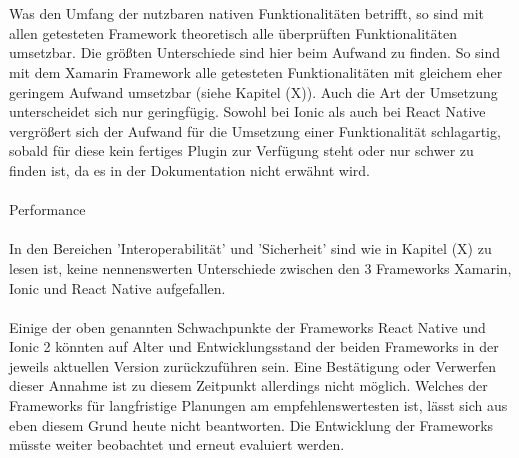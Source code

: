 \\
\\
Was den Umfang der nutzbaren nativen Funktionalitäten betrifft, so sind mit allen getesteten Framework theoretisch alle überprüften Funktionalitäten umsetzbar. Die größten Unterschiede sind hier beim Aufwand zu finden. So sind mit dem Xamarin Framework alle getesteten Funktionalitäten mit gleichem eher geringem Aufwand umsetzbar (siehe Kapitel (X)). Auch die Art der Umsetzung unterscheidet sich nur geringfügig. Sowohl bei Ionic als auch bei React Native vergrößert sich der Aufwand für die Umsetzung einer Funktionalität schlagartig, sobald für diese kein fertiges Plugin zur Verfügung steht oder nur schwer zu finden ist, da es in der Dokumentation nicht erwähnt wird.
\\
\\
Performance
\\
\\
In den Bereichen 'Interoperabilität' und 'Sicherheit' sind wie in Kapitel (X) zu lesen ist, keine nennenswerten Unterschiede zwischen den 3 Frameworks Xamarin, Ionic und React Native aufgefallen.
\\
\\
Einige der oben genannten Schwachpunkte der Frameworks React Native und Ionic 2 könnten auf Alter und Entwicklungsstand der beiden Frameworks in der jeweils aktuellen Version zurückzuführen sein. Eine Bestätigung oder Verwerfen dieser Annahme ist zu diesem Zeitpunkt allerdings nicht möglich. Welches der Frameworks für langfristige Planungen am empfehlenswertesten ist, lässt sich aus eben diesem Grund heute nicht beantworten. Die Entwicklung der Frameworks müsste weiter beobachtet und erneut evaluiert werden. 